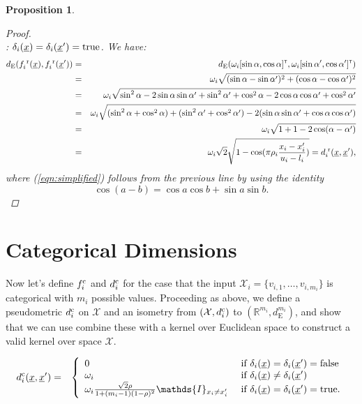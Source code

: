 \documentclass[letterpaper]{article}
\newcommand{\vect}[1]{\underline{\smash{#1}}}
\renewcommand{\v}[1]{\vect{#1}}
\newcommand{\reals}{\mathds{R}}
\newcommand{\sX}{\mathcal{X}}
\newcommand{\br}{^{\text{\textnormal{ r}}}}
\newcommand{\cat}{^{\text{\textnormal{c}}}}
\newcommand\transpose{{\textrm{\tiny{\sf{T}}}}}
\newtheorem{prop}[thm]{Proposition}
\newcommand{\indicator}{\ensuremath\mathds{I}}
\begin{document}
\begin{prop}
\begin{proof}
~\\: $\delta_i(\v{x}) = \delta_i(\v{x}') = \textrm{true}$. We have:
\begin{eqnarray}
\nonumber{}d_{\text{E}}(f_i\br(\v{x}),f_i\br(\v{x}')) & = & d_{\text{E}}(\omega_i [\sin{\alpha}, \cos{\alpha}]^\transpose, \omega_i [\sin{\alpha'}, \cos{\alpha'}]^\transpose)\\ 
\nonumber{}& = & \omega_i \sqrt{(\sin{\alpha}-\sin{\alpha'})^2+ (\cos{\alpha}-\cos{\alpha'})^2}\\
\nonumber{}& = & \omega_i \sqrt{\sin^2{\alpha} -2 \sin{\alpha}\sin{\alpha'} + \sin^2{\alpha'}  + \cos^2{\alpha} -2 \cos{\alpha}\cos{\alpha'} + \cos^2{\alpha'} }\\
\nonumber{}& = & \omega_i \sqrt{(\sin^2{\alpha}+\cos^2{\alpha})   +  (\sin^2{\alpha'}+\cos^2{\alpha'})   -2 (\sin{\alpha}\sin{\alpha'} + \cos{\alpha}\cos{\alpha'})}\\
\label{eqn:simplified}& = & \omega_i \sqrt{ 1+1-2 \cos(\alpha-\alpha')}\\
\nonumber& = & \omega_i \sqrt{2} \sqrt{1 - \cos(\pi\rho_i \frac{x_i-x_i'}{u_i-l_i})} = d\br_i(\v{x}, \v{x}'),
\end{eqnarray}
where (\ref{eqn:simplified}) follows from the previous line by using the identity 
\[\cos{(a-b)} = \cos{a}\cos{b} + \sin{a}\sin{b}.\]
\end{proof}
\end{prop}


\section{Categorical Dimensions}

Now let's define $f\cat_i$ and $d\cat_i$ for the case that the input $\sX_i=\{v_{i,1}, \dots, v_{i,m_i}\}$ is categorical with $m_i$ possible values. 
Proceeding as above, we define a pseudometric $d\cat_i$ on $\sX$ and an isometry from $(\sX, d\cat_i)$ to $(\reals^{m_i},d_{\text{E}}^{m_i})$, and show that we can use combine these
with a kernel over Euclidean space to construct a valid kernel over space $\sX$. 

\begin{eqnarray}
\nonumber{}d\cat_i(\v{x}, \v{x}') & = & \left\{
\begin{array}{ll}
\nonumber{} 0 & \textrm{ if } \delta_i(\v{x}) = \delta_i(\v{x}') = \textrm{false}\\
\nonumber{} \omega_i & \textrm{ if } \delta_i(\v{x}) \neq \delta_i(\v{x}')\\
\nonumber{} \omega_i \frac{\sqrt{2} \rho}
{1+(m_i-1)(1-\rho)^2}
 \indicator_{x_i \neq x_i'} 
& \textrm{ if } \delta_i(\v{x}) = \delta_i(\v{x}') = \textrm{true}.
\end{array}
\right.
\end{eqnarray}
\end{document}
